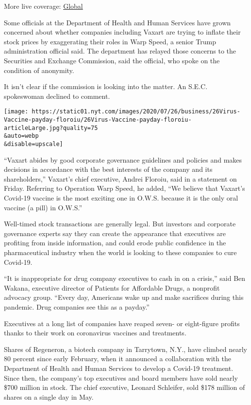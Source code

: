 More live coverage:
\href{https://www.nytimes.com/2020/08/04/world/coronavirus-cases.html?action=click\&pgtype=Article\&state=default\&region=MAIN_CONTENT_1\&context=storylines_live_updates}{Global}

Some officials at the Department of Health and Human Services have grown
concerned about whether companies including Vaxart are trying to inflate
their stock prices by exaggerating their roles in Warp Speed, a senior
Trump administration official said. The department has relayed those
concerns to the Securities and Exchange Commission, said the official,
who spoke on the condition of anonymity.

It isn't clear if the commission is looking into the matter. An S.E.C.
spokeswoman declined to comment.

\texttt{[image: https://static01.nyt.com/images/2020/07/26/business/26Virus-Vaccine-payday-floroiu/26Virus-Vaccine-payday-floroiu-articleLarge.jpg?quality=75\\\&auto=webp\\\&disable=upscale]}

``Vaxart abides by good corporate governance guidelines and policies and
makes decisions in accordance with the best interests of the company and
its shareholders,'' Vaxart's chief executive, Andrei Floroiu, said in a
statement on Friday. Referring to Operation Warp Speed, he added, ``We
believe that Vaxart's Covid-19 vaccine is the most exciting one in
O.W.S. because it is the only oral vaccine (a pill) in O.W.S.''

Well-timed stock transactions are generally legal. But investors and
corporate governance experts say they can create the appearance that
executives are profiting from inside information, and could erode public
confidence in the pharmaceutical industry when the world is looking to
these companies to cure Covid-19.

``It is inappropriate for drug company executives to cash in on a
crisis,'' said Ben Wakana, executive director of Patients for Affordable
Drugs, a nonprofit advocacy group. ``Every day, Americans wake up and
make sacrifices during this pandemic. Drug companies see this as a
payday.''

Executives at a long list of companies have reaped seven- or
eight-figure profits thanks to their work on coronavirus vaccines and
treatments.

Shares of Regeneron, a biotech company in Tarrytown, N.Y., have climbed
nearly 80 percent since early February, when it announced a
collaboration with the Department of Health and Human Services to
develop a Covid-19 treatment. Since then, the company's top executives
and board members have sold nearly \$700 million in stock. The chief
executive, Leonard Schleifer, sold \$178 million of shares on a single
day in May.

